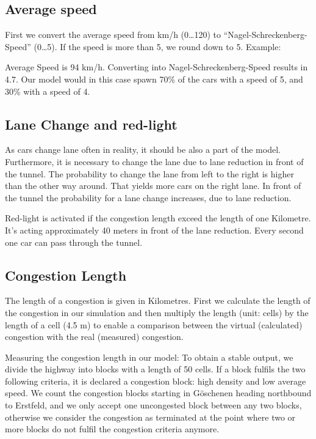 \subsection{Average speed}
First we convert the average speed from km/h (0\ldots 120) to “Nagel-Schreckenberg-Speed” (0\ldots 5). If the speed is more than 5, we round down to 5.
Example:

Average Speed is 94 km/h. Converting into Nagel-Schreckenberg-Speed results in 4.7. Our model would in this case spawn 70\% of the cars with a speed of 5, and 30\% with a speed of 4.

\subsection{Lane Change and red-light}
As cars change lane often in reality, it should be also a part of the model. Furthermore, it is necessary to change the lane due to lane reduction in front of the tunnel. The probability to change the lane from left to the right is higher than the other way around. That yields more cars on the right lane. In front of the tunnel the probability for a lane change increases, due to lane reduction.

Red-light is activated if the congestion length exceed the length of one Kilometre. It's acting approximately 40 meters in front of the lane reduction. Every second one car can pass through the tunnel. 


\subsection{Congestion Length}
The length of a congestion is given in Kilometres. First we calculate the length of the congestion in our simulation and then multiply the length (unit: cells) by the length of a cell (4.5 m) to enable a comparison between the virtual (calculated) congestion with the real (measured) congestion.

Measuring the congestion length in our model: To obtain a stable output, we divide the highway into blocks with a length of 50 cells. If a block fulfils the two following criteria, it is declared a congestion block: high density and low average speed. We count the congestion blocks starting in Göschenen heading northbound to Erstfeld, and we only accept one uncongested block between any two blocks, otherwise we consider the congestion as terminated at the point where two or more blocks do not fulfil the congestion criteria anymore.

